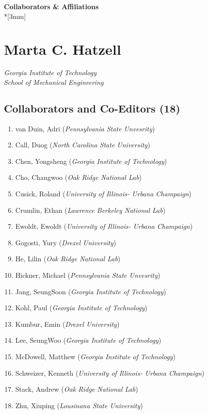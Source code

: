 \renewcommand{\LeftFooter}{Collaborators \& Affiliations}
\renewcommand{\LeftHeader}{Marta C. Hatzell}
\renewcommand{\PageLimit}{0}
\begin{center}
{\bf Collaborators \& Affiliations} \\*[3mm]
\end{center}

\setcounter{section}{0}

\section*{Marta C. Hatzell}

\emph{Georgia Institute of Technology}\\\emph{School of Mechanical Engineering}

\subsection*{Collaborators and Co-Editors
(18)}\label{collaborators-and-co-editors-18}

\begin{enumerate}
\def\labelenumi{\arabic{enumi}.}
\itemsep1pt\parskip0pt
\item
  van Duin, Adri (\emph{Pennsylvania State Unvesrity})
\item
  Call, Duog (\emph{North Carolina State University})
\item
  Chen, Yongsheng (\emph{Georgia Institute of Technology})
\item
  Cho, Changwoo (\emph{Oak Ridge National Lab})
\item
  Cusick, Roland (\emph{University of Illinois- Urbana Champaign})
\item
  Crumlin, Ethan (\emph{Lawrence Berkeley National Lab})
\item
  Ewoldt, Ewoldt (\emph{University of Illinois- Urbana Champaign})
\item
  Gogosti, Yury (\emph{Drexel University})
\item
  He, Lilin (\emph{Oak Ridge National Lab})
\item
  Hickner, Michael (\emph{Pennsylvania State Unvesrity})
\item
  Jang, SeungSoon (\emph{Georgia Institute of Technology})
\item
  Kohl, Paul (\emph{Georgia Institute of Technology})
\item
  Kumbur, Emin (\emph{Drexel University})
\item
  Lee, SeungWoo (\emph{Georgia Institute of Technology})
\item
  McDowell, Matthew (\emph{Georgia Institute of Technology})
\item
  Schweizer, Kenneth (\emph{University of Illinois- Urbana Champaign})
\item
  Stack, Andrew (\emph{Oak Ridge National Lab})
\item
  Zhu, Xiuping (\emph{Lousinana State University})
\end{enumerate}

